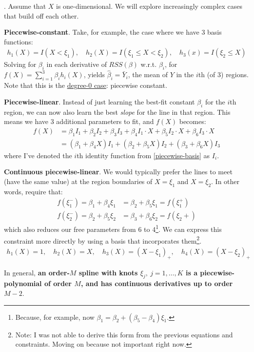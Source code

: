 \documentclass[11pt]{article}
\begin{document}
\myspace
\p {}. Assume that $X$ is one-dimensional. We will explore increasingly complex cases that build off each other.
\begin{compactitem}
	\item \textbf{Piecewise-constant}. Take, for example, the case where we have 3 basis functions:
	\begin{align}
	h_1(X) = I(X < \xi_1), \quad h_2(X) = I(\xi_1 \le X < \xi_2), \quad h_3(x) = I(\xi_2 \le X) \label{piecewise-basis}
	\end{align}
	Solving for $\beta_i$ in each derivative of $RSS(\beta)$ w.r.t. $\beta_i$, for $f(X) = \sum_{i = 1}^{3} \beta_i h_i(X)$, yields $\hat \beta_i = \bar Y_i$, the mean of $Y$ in the $i$th (of 3) regions. Note that this is the \underline{degree-0 case}: piecewise constant. \\
	
	\item \textbf{Piecewise-linear}. Instead of just learning the best-fit constant $\beta_i$ for the $i$th region, we can now also learn the best \textit{slope} for the line in that region. This means we have 3 additional parameters to fit, and $f(X)$ becomes:
	\begin{align}
	f(X) &= \beta_1 I_1 + \beta_2 I_2 + \beta_3 I_3 + \beta_4 I_1 \cdot X + \beta_5 I_2 \cdot X + \beta_6 I_3 \cdot X \\
	&= (\beta_1 + \beta_4 X) I_1 + (\beta_2 + \beta_5 X) I_2 + (\beta_3 + \beta_6 X) I_3
	\end{align}
	where I've denoted the $i$th identity function from \ref{piecewise-basis} as $I_i$. 
	
	\item \textbf{Continuous piecewise-linear}. We would typically prefer the lines to meet (have the same value) at the region boundaries of $X = \xi_1$ and $X = \xi_2$. In other words, require that:
	\begin{align}
	f(\xi_1^-) = \beta_1 + \beta_4 \xi_1 &= \beta_2 + \beta_5 \xi_1 = f(\xi_1^+) \\
	f(\xi_2^-) = \beta_2 + \beta_5\xi_2 &= \beta_3 + \beta_6 \xi_2 = f(\xi_2+)
	\end{align}
	which also reduces our free parameters from 6 to 4\footnote{Because, for example, now $\beta_1 = \beta_2 + (\beta_5 - \beta_4) \xi_1$.}. We can express this constraint more directly by using a basis that incorporates them\footnote{Note: I was not able to derive this form from the previous equations and constraints. Moving on because not important right now.}. 
	\begin{align}
	h_1(X) = 1, \quad h_2(X) = X, \quad h_3(X) = (X - \xi_1)_+, \quad h_4(X) = (X - \xi_2)_+
	\end{align}                                               
\end{compactitem}
In general, \textbf{an order-$M$ spline with knots $\xi_j, ~ j = 1,\ldots,K$ is a piecewise-polynomial of order $M$, and has continuous derivatives up to order $M-2$}. 
\end{document}
